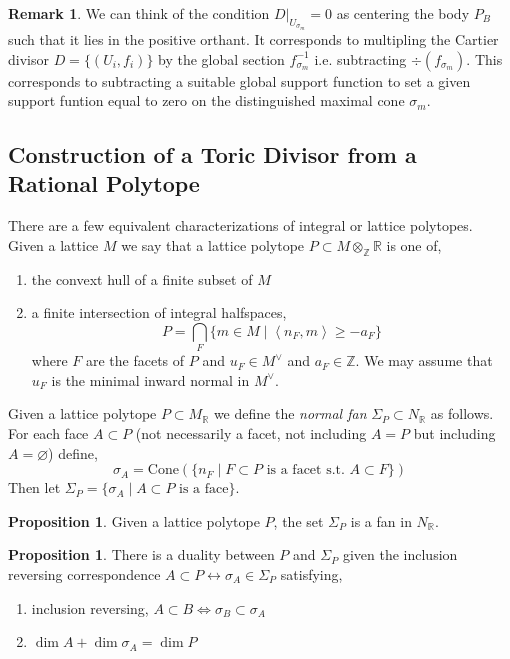 \documentclass[12pt]{extarticle}
\newcommand{\Z}{\mathbb{Z}}
\newcommand{\R}{\mathbb{R}}
\theoremstyle{definition}
\newtheorem{proposition}[theorem]{Proposition}
\newtheorem{remark}{Remark}
\newenvironment{definition}[1][Definition:]{\begin{trivlist}
\item[\hskip \labelsep {\bfseries #1}]}{\end{trivlist}}
\newcommand{\inner}[2]{\left< #1, #2 \right>}
\begin{document}
\begin{remark}
We can think of the condition $D|_{U_{\sigma_m}} = 0$ as centering the body $P_B$ such that it lies in the positive orthant. It corresponds to multipling the Cartier divisor $D = \{ (U_i, f_i) \}$ by the global section $f_{\sigma_m}^{-1}$ i.e. subtracting $\div{(f_{\sigma_m})}$. This corresponds to subtracting a suitable global support function to set a given support funtion equal to zero on the distinguished maximal cone $\sigma_m$.
\end{remark}

\subsection{Construction of a Toric Divisor from a Rational Polytope}

\begin{definition}
There are a few equivalent characterizations of integral or lattice polytopes. Given a lattice $M$ we say that a lattice polytope $P \subset M \otimes_\Z \R$ is one of,
\begin{enumerate}
\item the convext hull of a finite subset of $M$
\item a finite intersection of integral halfspaces,
\[ P = \bigcap_F \{ m \in M \mid \inner{n_F}{m} \ge - a_F \} \]
where $F$ are the facets of $P$ and $u_F \in M^\vee$ and $a_F \in \Z$. We may assume that $u_F$ is the minimal inward normal in $M^\vee$.
\end{enumerate}
\end{definition}

\newcommand{\Cone}{\mathrm{Cone}}

\begin{definition}
Given a lattice polytope $P \subset M_\R$ we define the \textit{normal fan} $\Sigma_P \subset N_\R$ as follows. For each face $A \subset P$ (not necessarily a facet, not including $A = P$ but including $A = \varnothing$) define,
\[ \sigma_A = \Cone( \{ n_F \mid F \subset P \text{ is a facet s.t. } A \subset F \} ) \]
Then let $\Sigma_P = \{ \sigma_A \mid A \subset P \text{ is a face} \}$.
\end{definition}

\begin{proposition}
Given a lattice polytope $P$, the set $\Sigma_P$ is a fan in $N_\R$.
\end{proposition}

\begin{proposition}
There is a duality between $P$ and $\Sigma_P$ given the inclusion reversing correspondence $A \subset P \leftrightarrow \sigma_A \in \Sigma_P$ satisfying,
\begin{enumerate}
\item inclusion reversing, $A \subset B \iff \sigma_B \subset \sigma_A$
\item $\dim{A} + \dim{\sigma_A} = \dim{P}$
\end{enumerate}
\end{proposition}
\end{document}
